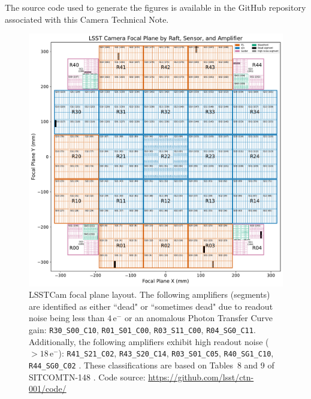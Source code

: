 \documentclass[OPS,authoryear,toc]{lsstdoc}
\begin{document}
The source code used to generate the figures is available in the GitHub repository associated with this Camera Technical Note.

\clearpage

\begin{figure}
  \centering
  \includegraphics[width=\textwidth]{figures/LSSTCam_focal_plane_CTN_001_FIG1.pdf}
  \caption{LSSTCam focal plane layout. The following amplifiers (segments) are identified as either ``dead" or ``sometimes dead" due to readout noise being less than $4\,\mathrm{e}^{-}$ or an anomalous Photon Transfer Curve gain: {\tt{R30\_S00\_C10}}, {\tt{R01\_S01\_C00}}, {\tt{R03\_S11\_C00}}, {\tt{R04\_SG0\_C11}}. Additionally, the following amplifiers exhibit high readout noise ($> 18\,\mathrm{e}^{-}$): {\tt{R41\_S21\_C02}}, {\tt{R43\_S20\_C14}}, {\tt{R03\_S01\_C05}}, {\tt{R40\_SG1\_C10}},  {\tt{R44\_SG0\_C02}} . These classifications are based on Tables~8 and 9 of SITCOMTN-148 \citep{utsumi25}. Code source: \url{https://github.com/lsst/ctn-001/code/}}
  \label{fig:focal_plane_1}
\end{figure}

\clearpage
\end{document}
